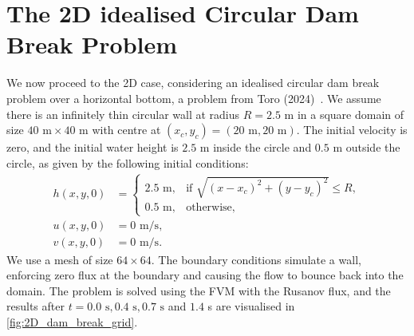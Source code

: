 \section{The 2D idealised Circular Dam Break Problem}\label{sec:2D_dam_break}
We now proceed to the 2D case, considering an idealised circular dam break problem over a horizontal bottom, a problem from Toro (2024)~\cite{Toro2024}.
We assume there is an infinitely thin circular wall at radius $R = 2.5$ m in a square domain of size $40 \text{ m} \times 40 \text{ m}$ with centre at $(x_c,y_c) = (20 \text{ m}, 20 \text{ m})$.
The initial velocity is zero, and the initial water height is $2.5$ m inside the circle and $0.5$ m outside the circle, as given by the following initial conditions:
\begin{align*}
    h(x,y,0) &= \begin{cases}
        2.5 \text{ m}, & \text{if } \sqrt{ {(x-x_c)}^2 + {(y-y_c)}^2 } \leq R, \\
        0.5 \text{ m}, & \text{otherwise},
    \end{cases} \\
    u(x,y,0) &= 0 \text{ m/s}, \\
    v(x,y,0) &= 0 \text{ m/s}.
\end{align*}
We use a mesh of size $64 \times 64$.
The boundary conditions simulate a wall, enforcing zero flux at the boundary and causing the flow to bounce back into the domain.
The problem is solved using the FVM with the Rusanov flux, and the results after $t=0.0 \text{ s}, 0.4 \text{ s}, 0.7 \text{ s}$ and $1.4$ s are visualised in \autoref{fig:2D_dam_break_grid}.
